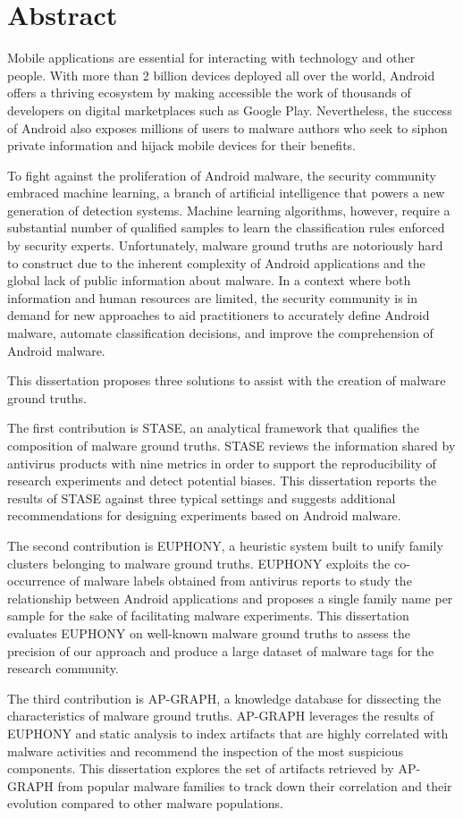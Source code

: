 \chapter*{Abstract}
Mobile applications are essential for interacting with technology and other people.
With more than 2 billion devices deployed all over the world, Android offers a thriving ecosystem by making accessible the work of thousands of developers on digital marketplaces such as Google Play.
Nevertheless, the success of Android also exposes millions of users to malware authors who seek to siphon private information and hijack mobile devices for their benefits.

To fight against the proliferation of Android malware, the security community embraced machine learning, a branch of artificial intelligence that powers a new generation of detection systems. 
Machine learning algorithms, however, require a substantial number of qualified samples to learn the classification rules enforced by security experts.
Unfortunately, malware ground truths are notoriously hard to construct due to the inherent complexity of Android applications and the global lack of public information about malware.
In a context where both information and human resources are limited, the security community is in demand for new approaches to aid practitioners to accurately define Android malware, automate classification decisions, and improve the comprehension of Android malware.

This dissertation proposes three solutions to assist with the creation of malware ground truths.

The first contribution is STASE, an analytical framework that qualifies the composition of malware ground truths.
STASE reviews the information shared by antivirus products with nine metrics in order to support the reproducibility of research experiments and detect potential biases.
This dissertation reports the results of STASE against three typical settings and suggests additional recommendations for designing experiments based on Android malware.

The second contribution is EUPHONY, a heuristic system built to unify family clusters belonging to malware ground truths.
EUPHONY exploits the co-occurrence of malware labels obtained from antivirus reports to study the relationship between Android applications and proposes a single family name per sample for the sake of facilitating malware experiments.
This dissertation evaluates EUPHONY on well-known malware ground truths to assess the precision of our approach and produce a large dataset of malware tags for the research community.

The third contribution is AP-GRAPH, a knowledge database for dissecting the characteristics of malware ground truths.
AP-GRAPH leverages the results of EUPHONY and static analysis to index artifacts that are highly correlated with malware activities and recommend the inspection of the most suspicious components.
This dissertation explores the set of artifacts retrieved by AP-GRAPH from popular malware families to track down their correlation and their evolution compared to other malware populations.
